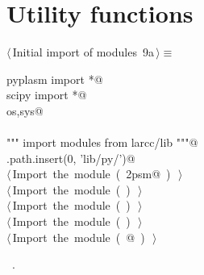 \documentclass[11pt,oneside]{article}	%
\begin{document}
\appendix
\section{Utility functions}

\begin{flushleft} \small \label{scrap19}
\protect{}$\langle\,$Initial import of modules\nobreak\ {\footnotesize 9a}$\,\rangle\equiv$
\vspace{-1ex}
\begin{list}{}{} \item
\mbox{}\verb@from pyplasm import *@\\
\mbox{}\verb@from scipy import *@\\
\mbox{}\verb@import os,sys@\\
\mbox{}\verb@@\\
\mbox{}\verb@""" import modules from larcc/lib """@\\
\mbox{}\verb@sys.path.insert(0, 'lib/py/')@\\
\mbox{}\verb@@\hbox{$\langle\,$Import the module\nobreak\ ({\footnotesize {}\label{scrap20}
 }\mbox{}\verb@lar2psm@ ) {\footnotesize {}}$\,\rangle$}\verb@@\\
\mbox{}\verb@@\hbox{$\langle\,$Import the module\nobreak\ ({\footnotesize {}\label{scrap21}
 }\mbox{}\verb@simplexn@ ) {\footnotesize {}}$\,\rangle$}\verb@@\\
\mbox{}\verb@@\hbox{$\langle\,$Import the module\nobreak\ ({\footnotesize {}\label{scrap22}
 }\mbox{}\verb@larcc@ ) {\footnotesize {}}$\,\rangle$}\verb@@\\
\mbox{}\verb@@\hbox{$\langle\,$Import the module\nobreak\ ({\footnotesize {}\label{scrap23}
 }\mbox{}\verb@largrid@ ) {\footnotesize {}}$\,\rangle$}\verb@@\\
\mbox{}\verb@@\hbox{$\langle\,$Import the module\nobreak\ ({\footnotesize {}\label{scrap24}
 }\mbox{}@ ) {\footnotesize {}}$\,\rangle$}\verb@@\\
\mbox{}\verb@@{\NWsep}
\end{list}
\vspace{-1ex}
\footnotesize\addtolength{\baselineskip}{-1ex}
\begin{list}{}{\setlength{\itemsep}{-\parsep}\setlength{\itemindent}{-\leftmargin}}
\item \NWtxtMacroRefIn\ .
\end{list}
\end{flushleft}
\end{document}
